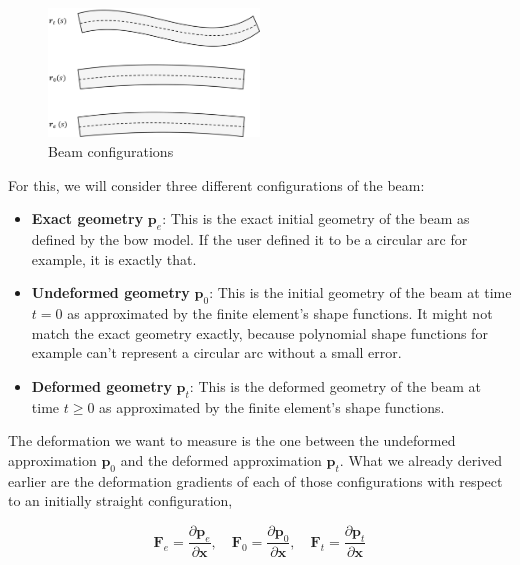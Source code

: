 \begin{figure}[h]
\centering
\includegraphics[width=0.5\textwidth]{figures/elements/beam-kinematics-configurations}
\caption{Beam configurations}
\label{fig:beam-kinematics-configurations}
\end{figure}

For this, we will consider three different configurations of the beam:

\begin{itemize}
\item \textbf{Exact geometry} $\boldsymbol{p}_{e}$: This is the exact initial geometry of the beam as defined by the bow model. If the user defined it to be a circular arc for example, it is exactly that.

\item \textbf{Undeformed geometry} $\boldsymbol{p}_{0}$: This is the initial geometry of the beam at time $t = 0$ as approximated by the finite element's shape functions. It might not match the exact geometry exactly, because polynomial shape functions for example can't represent a circular arc without a small error.

\item \textbf{Deformed geometry} $\boldsymbol{p}_{t}$: This is the deformed geometry of the beam at time $t \ge 0$ as approximated by the finite element's shape functions.
\end{itemize}

The deformation we want to measure is the one between the undeformed approximation $\boldsymbol{p}_{0}$ and the deformed approximation $\boldsymbol{p}_{t}$.
What we already derived earlier are the deformation gradients of each of those configurations with respect to an initially straight configuration,

\begin{equation}
\boldsymbol{F}_{e} = \frac{\partial \boldsymbol{p}_{e}}{\partial \boldsymbol{x}}, \quad \boldsymbol{F}_{0} = \frac{\partial \boldsymbol{p}_{0}}{\partial \boldsymbol{x}}, \quad \boldsymbol{F}_{t} = \frac{\partial \boldsymbol{p}_{t}}{\partial \boldsymbol{x}}
\end{equation}

